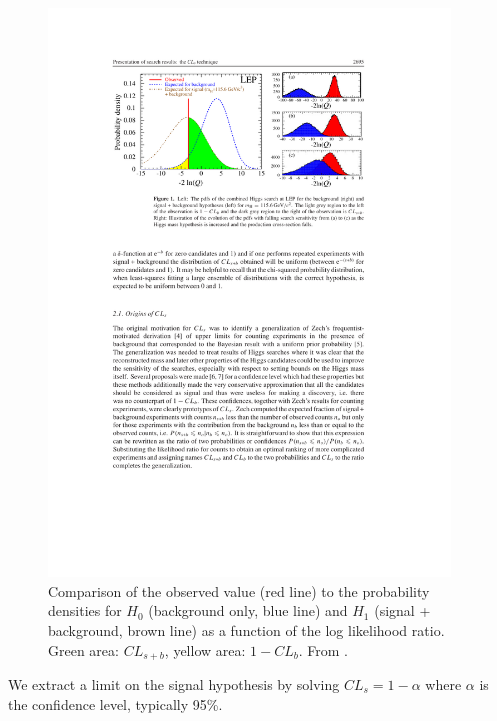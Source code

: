 \begin{figure}[htbp]
\begin{center}
\includegraphics[width=0.95\textwidth]{figures/g21013-fig1.pdf}
\caption{Comparison of the observed value (red line) to the probability densities for $H_{0}$ (background only, blue line) and $H_{1}$ (signal + background, brown line) as a function of the log likelihood ratio. Green area: $CL_{s+b}$, yellow area: $1-CL_{b}$. From \cite{Read:presentation}.}
\label{fig:q}
\end{center}
\end{figure}

We extract a limit on the signal hypothesis by solving $CL_{s}=1-\alpha$ where $\alpha$ is the confidence level, typically 95\%.